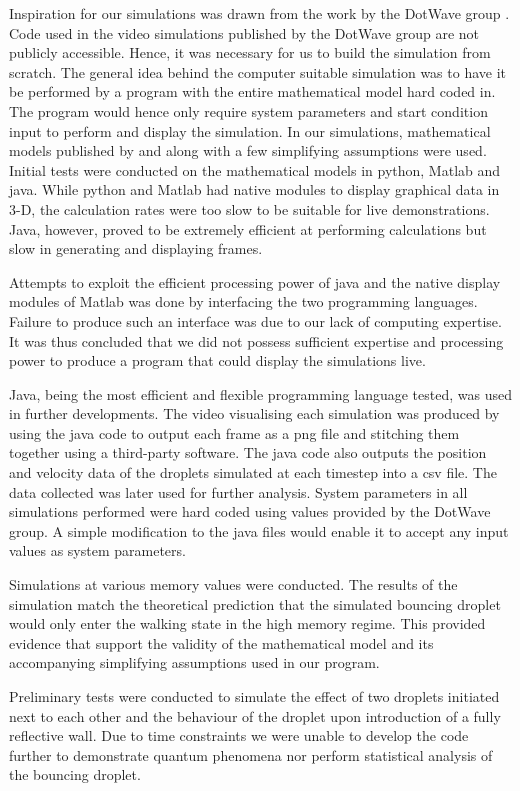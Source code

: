 Inspiration for our simulations was drawn from the work by the DotWave group \cite{dotwave}. Code used in the video simulations published by the DotWave group are not publicly accessible. Hence, it was necessary for us to build the simulation from scratch. The general idea behind the computer suitable simulation was to have it be performed by a program with the entire mathematical model hard coded in. The program would hence only require system parameters and start condition input to perform and display the simulation.
In our simulations, mathematical models published by \cite{oza2013trajectory} and \cite{brady2014bouncing} along with a few simplifying assumptions were used. Initial tests were conducted on the mathematical models in python, Matlab and java. While python and Matlab had native modules to display graphical data in 3-D, the calculation rates were too slow to be suitable for live demonstrations. Java, however, proved to be extremely efficient at performing calculations but slow in generating and displaying frames. 

Attempts to exploit the efficient processing power of java and the native display modules of Matlab was done by interfacing the two programming languages. Failure to produce such an interface was due to our lack of computing expertise. It was thus concluded that we did not possess sufficient expertise and processing power to produce a program that could display the simulations live.

Java, being the most efficient and flexible programming language tested, was used in further developments. The video visualising each simulation was produced by using the java code to output each frame as a png file and stitching them together using a third-party software. The java code also outputs the position and velocity data of the droplets simulated at each timestep into a csv file. The data collected was later used for further analysis. System parameters in all simulations performed were hard coded using values provided by the DotWave group. A simple modification to the java files would enable it to accept any input values as system parameters.

Simulations at various memory values were conducted. The results of the simulation match the theoretical prediction that the simulated bouncing droplet would only enter the walking state in the high memory regime. This provided evidence that support the validity of the mathematical model and its accompanying simplifying assumptions used in our program.

Preliminary tests were conducted to simulate the effect of two droplets initiated next to each other and the behaviour of the droplet upon introduction of a fully reflective wall. Due to time constraints we were unable to develop the code further to demonstrate quantum phenomena nor perform statistical analysis of the bouncing droplet. 
